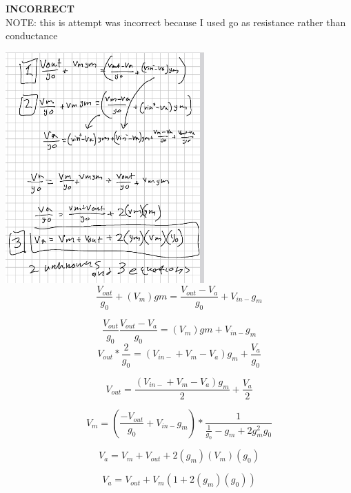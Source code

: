 \documentclass[10pt,a4paper]{article}
\begin{document}
\textbf{INCORRECT}\\
NOTE: this is attempt was incorrect because I used go as resistance rather than conductance

\includegraphics[width=3in]{images/p1p3.png} \\
\begin{equation}
\frac{V_{out}}{g_0} + (V_m) gm = \frac{V_{out} - V_a }{g_0} + V_{in-}g_m 
\end{equation}

\begin{equation}
\frac{V_{out}}{g_0} \frac{V_{out} - V_a }{g_0} = (V_m) gm + V_{in-}g_m 
\end{equation}
\begin{equation}
V_{out} * \frac{2}{g_0} = (V_{in-} + V_m - V_a)g_m +  \frac{V_{a}}{g_0}
\end{equation}

\begin{equation}
V_{out} = \frac{(V_{in-} + V_m - V_a)g_m}{2} +  \frac{V_{a}}{2}
\end{equation}



\begin{equation}
V_{m} = (\frac{-V_{out}}{g_0} + V_{in-}g_m) * \frac{1}{\frac{1}{g_0} - g_m + 2g_m^2g_0}
\end{equation}

\begin{equation}
V_{a} = V_m + V_{out} + 2(g_m)(V_m)(g_0)
\end{equation}

\begin{equation}
V_{a} = V_{out} + V_m( 1+ 2(g_m)(g_0))
\end{equation}
\end{document}
